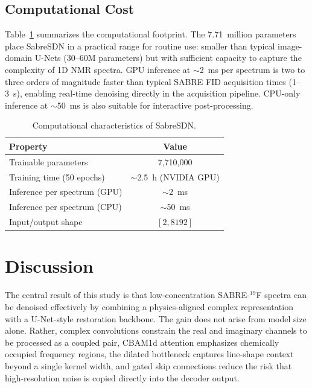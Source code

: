 \documentclass{article}
\begin{document}
\subsection{Computational Cost}

Table~\ref{tab:compute} summarizes the computational footprint. The 7.71~million parameters place SabreSDN in a practical range for routine use: smaller than typical image-domain U-Nets (30--60M parameters) but with sufficient capacity to capture the complexity of 1D NMR spectra. GPU inference at $\sim$2~ms per spectrum is two to three orders of magnitude faster than typical SABRE FID acquisition times (1--3~s), enabling real-time denoising directly in the acquisition pipeline. CPU-only inference at $\sim$50~ms is also suitable for interactive post-processing.

\begin{table}[t]
    \centering
    \caption{Computational characteristics of SabreSDN.}
    \label{tab:compute}
    \begin{tabular}{l c}
        \toprule
        Property & Value \\
        \midrule
        Trainable parameters & 7,710,000 \\
        Training time (50 epochs) & $\sim$2.5~h (NVIDIA GPU) \\
        Inference per spectrum (GPU) & $\sim$2~ms \\
        Inference per spectrum (CPU) & $\sim$50~ms \\
        Input/output shape & $[2, 8192]$ \\
        \bottomrule
    \end{tabular}
\end{table}

\section{Discussion}

The central result of this study is that low-concentration SABRE-$^{19}$F spectra can be denoised effectively by combining a physics-aligned complex representation with a U-Net-style restoration backbone. The gain does not arise from model size alone. Rather, complex convolutions constrain the real and imaginary channels to be processed as a coupled pair, CBAM1d attention emphasizes chemically occupied frequency regions, the dilated bottleneck captures line-shape context beyond a single kernel width, and gated skip connections reduce the risk that high-resolution noise is copied directly into the decoder output.
\end{document}
